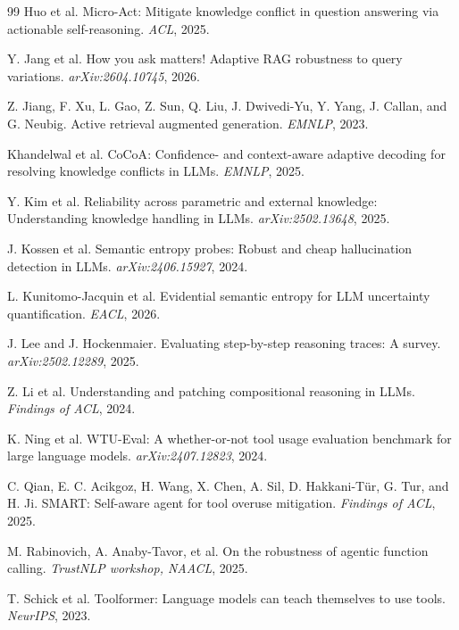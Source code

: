 \documentclass[10pt,letterpaper]{article}
\begin{document}
\begin{thebibliography}{99}
Huo et al.
Micro-{A}ct: Mitigate knowledge conflict in question answering via actionable self-reasoning.
\emph{ACL}, 2025.

Y. Jang et al.
How you ask matters! {A}daptive {RAG} robustness to query variations.
\emph{arXiv:2604.10745}, 2026.

Z. Jiang, F. Xu, L. Gao, Z. Sun, Q. Liu, J. Dwivedi-Yu, Y. Yang, J. Callan, and G. Neubig.
Active retrieval augmented generation.
\emph{EMNLP}, 2023.

Khandelwal et al.
{CoCoA}: Confidence- and context-aware adaptive decoding for resolving knowledge conflicts in {LLMs}.
\emph{EMNLP}, 2025.

Y. Kim et al.
Reliability across parametric and external knowledge: Understanding knowledge handling in {LLMs}.
\emph{arXiv:2502.13648}, 2025.

J. Kossen et al.
Semantic entropy probes: Robust and cheap hallucination detection in {LLMs}.
\emph{arXiv:2406.15927}, 2024.

L. Kunitomo-Jacquin et al.
Evidential semantic entropy for {LLM} uncertainty quantification.
\emph{EACL}, 2026.

J. Lee and J. Hockenmaier.
Evaluating step-by-step reasoning traces: A survey.
\emph{arXiv:2502.12289}, 2025.

Z. Li et al.
Understanding and patching compositional reasoning in {LLMs}.
\emph{Findings of ACL}, 2024.

K. Ning et al.
{WTU-Eval}: A whether-or-not tool usage evaluation benchmark for large language models.
\emph{arXiv:2407.12823}, 2024.

C. Qian, E. C. Acikgoz, H. Wang, X. Chen, A. Sil, D. Hakkani-T\"ur, G. Tur, and H. Ji.
{SMART}: Self-aware agent for tool overuse mitigation.
\emph{Findings of ACL}, 2025.

M. Rabinovich, A. Anaby-Tavor, et al.
On the robustness of agentic function calling.
\emph{TrustNLP workshop, NAACL}, 2025.

T. Schick et al.
Toolformer: Language models can teach themselves to use tools.
\emph{NeurIPS}, 2023.


\end{thebibliography}
\end{document}
